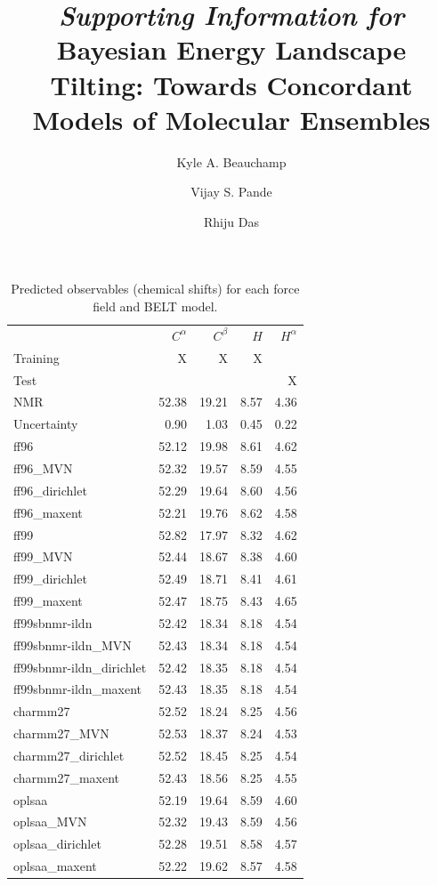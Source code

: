 \documentclass[12pt]{article}
\author{Kyle A. Beauchamp \and Vijay S. Pande \and Rhiju Das}
\title{{\it Supporting Information for } Bayesian Energy Landscape Tilting: Towards Concordant Models of Molecular Ensembles}
\begin{document}
\maketitle


\newpage

\begin{table}
 
\begin{tabular}{lrrrr}
\toprule
  &    $C^\alpha$ &    $C^\beta$ &    $H$ &   $H^\alpha$ \\
Training & X & X & X & \\                    
Test & &  & & X \\
NMR                         & 52.38 & 19.21 & 8.57 & 4.36 \\
Uncertainty                 &  0.90 &  1.03 & 0.45 & 0.22 \\

\toprule
ff96                     & 52.12 & 19.98 & 8.61 & 4.62 \\
ff96\_MVN                 & 52.32 & 19.57 & 8.59 & 4.55 \\
ff96\_dirichlet           & 52.29 & 19.64 & 8.60 & 4.56 \\
ff96\_maxent              & 52.21 & 19.76 & 8.62 & 4.58 \\
\toprule
ff99                     & 52.82 & 17.97 & 8.32 & 4.62 \\
ff99\_MVN                 & 52.44 & 18.67 & 8.38 & 4.60 \\
ff99\_dirichlet           & 52.49 & 18.71 & 8.41 & 4.61 \\
ff99\_maxent              & 52.47 & 18.75 & 8.43 & 4.65 \\
\toprule
ff99sbnmr-ildn           & 52.42 & 18.34 & 8.18 & 4.54 \\
ff99sbnmr-ildn\_MVN       & 52.43 & 18.34 & 8.18 & 4.54 \\
ff99sbnmr-ildn\_dirichlet & 52.42 & 18.35 & 8.18 & 4.54 \\
ff99sbnmr-ildn\_maxent    & 52.43 & 18.35 & 8.18 & 4.54 \\
\toprule
charmm27                    & 52.52 & 18.24 & 8.25 & 4.56 \\
charmm27\_MVN                & 52.53 & 18.37 & 8.24 & 4.53 \\
charmm27\_dirichlet          & 52.52 & 18.45 & 8.25 & 4.54 \\
charmm27\_maxent             & 52.43 & 18.56 & 8.25 & 4.55 \\
\toprule
oplsaa                      & 52.19 & 19.64 & 8.59 & 4.60 \\
oplsaa\_MVN                  & 52.32 & 19.43 & 8.59 & 4.56 \\
oplsaa\_dirichlet            & 52.28 & 19.51 & 8.58 & 4.57 \\
oplsaa\_maxent               & 52.22 & 19.62 & 8.57 & 4.58 \\
\bottomrule


\end{tabular}
\caption{
Predicted observables (chemical shifts) for each force field and BELT model.  
}
\end{table}
\newpage
\end{document}
